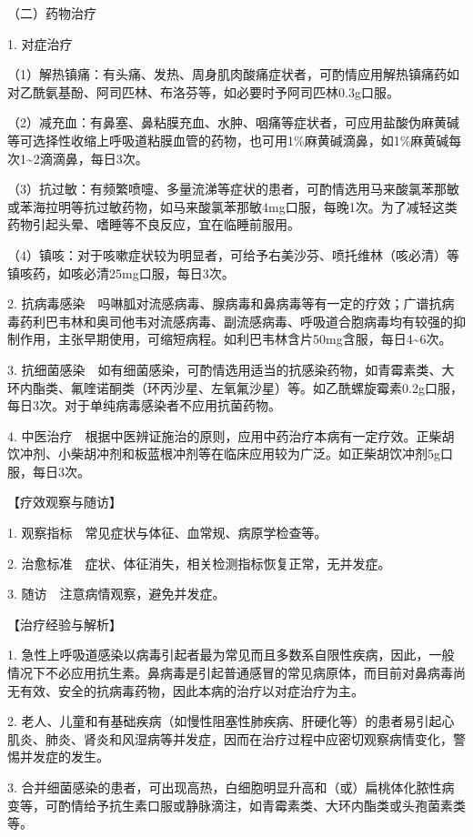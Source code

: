 {（二）药物治疗}

1. 对症治疗

（1）解热镇痛：有头痛、发热、周身肌肉酸痛症状者，可酌情应用解热镇痛药如对乙酰氨基酚、阿司匹林、布洛芬等，如必要时予阿司匹林0.3g口服。

（2）减充血：有鼻塞、鼻粘膜充血、水肿、咽痛等症状者，可应用盐酸伪麻黄碱等可选择性收缩上呼吸道粘膜血管的药物，也可用1\%麻黄碱滴鼻，如1\%麻黄碱每次1\textasciitilde{}2滴滴鼻，每日3次。

（3）抗过敏：有频繁喷嚏、多量流涕等症状的患者，可酌情选用马来酸氯苯那敏或苯海拉明等抗过敏药物，如马来酸氯苯那敏4mg口服，每晚1次。为了减轻这类药物引起头晕、嗜睡等不良反应，宜在临睡前服用。

（4）镇咳：对于咳嗽症状较为明显者，可给予右美沙芬、喷托维林（咳必清）等镇咳药，如咳必清25mg口服，每日3次。

2.
抗病毒感染　吗啉胍对流感病毒、腺病毒和鼻病毒等有一定的疗效；广谱抗病毒药利巴韦林和奥司他韦对流感病毒、副流感病毒、呼吸道合胞病毒均有较强的抑制作用，主张早期使用，可缩短病程。如利巴韦林含片50mg含服，每日4\textasciitilde{}6次。

3.
抗细菌感染　如有细菌感染，可酌情选用适当的抗感染药物，如青霉素类、大环内酯类、氟喹诺酮类（环丙沙星、左氧氟沙星）等。如乙酰螺旋霉素0.2g口服，每日3次。对于单纯病毒感染者不应用抗菌药物。

4.
中医治疗　根据中医辨证施治的原则，应用中药治疗本病有一定疗效。正柴胡饮冲剂、小柴胡冲剂和板蓝根冲剂等在临床应用较为广泛。如正柴胡饮冲剂5g口服，每日3次。

【疗效观察与随访】

1. 观察指标　常见症状与体征、血常规、病原学检查等。

2. 治愈标准　症状、体征消失，相关检测指标恢复正常，无并发症。

3. 随访　注意病情观察，避免并发症。

【治疗经验与解析】

1.
急性上呼吸道感染以病毒引起者最为常见而且多数系自限性疾病，因此，一般情况下不必应用抗生素。鼻病毒是引起普通感冒的常见病原体，而目前对鼻病毒尚无有效、安全的抗病毒药物，因此本病的治疗以对症治疗为主。

2.
老人、儿童和有基础疾病（如慢性阻塞性肺疾病、肝硬化等）的患者易引起心肌炎、肺炎、肾炎和风湿病等并发症，因而在治疗过程中应密切观察病情变化，警惕并发症的发生。

3.
合并细菌感染的患者，可出现高热，白细胞明显升高和（或）扁桃体化脓性病变等，可酌情给予抗生素口服或静脉滴注，如青霉素类、大环内酯类或头孢菌素类等。


